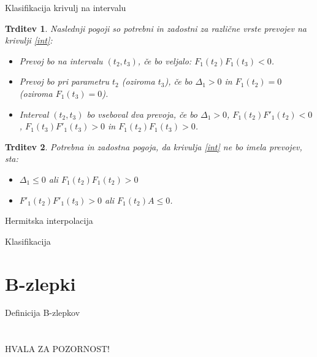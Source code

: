 \documentclass{beamer} %
\newtheorem{trditev}{Trditev}
\begin{document}
\begin{frame}{Klasifikacija krivulj na intervalu}
	\begin{trditev}
		Naslednji pogoji so potrebni in zadostni za različne vrste prevojev na krivulji \eqref{int}:
		\begin{itemize}
			\item Prevoj bo na intervalu $(t_2, t_3)$, če bo veljalo:
			$F_1(t_2)F_1(t_3) <0$.
			\item Prevoj bo pri parametru $t_2$ (oziroma $t_3$), če bo
			$\Delta_1 > 0$ in $F_1(t_2) = 0$ (oziroma $F_1(t_3) = 0$).
			\item Interval $(t_2, t_3)$ bo vseboval dva prevoja, če bo $\Delta_1 >0 $, $F_1(t_2)F'_1(t_2) <0$, $F_1(t_3)F'_1(t_3) >0$ in $F_1(t_2)F_1(t_3) >0$. 
		\end{itemize}
	\end{trditev}
	\begin{trditev}
		Potrebna in zadostna pogoja, da krivulja \eqref{int} ne bo imela prevojev, sta:
		\begin{itemize}
			\item $\Delta_1 \leq 0$ ali $F_1(t_2)F_1(t_2) > 0$
			\item $F'_1(t_2)F'_1(t_3)>0$ ali $F_1(t_2)A \leq 0$.
		\end{itemize}
	\end{trditev}
\end{frame}

\begin{frame}{Hermitska interpolacija}
	
\end{frame}

\begin{frame}{Klasifikacija}
	
\end{frame}
\section{B-zlepki}
\begin{frame}{Definicija B-zlepkov}
	
\end{frame}

\section{}
\begin{frame}
\begin{center}
HVALA ZA POZORNOST! 
\end{center}
\end{frame}

 
\end{document}
